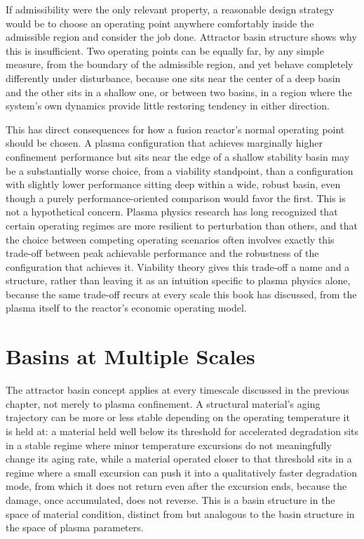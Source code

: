 If admissibility were the only relevant property, a reasonable design strategy would be to choose an operating point anywhere comfortably inside the admissible region and consider the job done. Attractor basin structure shows why this is insufficient. Two operating points can be equally far, by any simple measure, from the boundary of the admissible region, and yet behave completely differently under disturbance, because one sits near the center of a deep basin and the other sits in a shallow one, or between two basins, in a region where the system's own dynamics provide little restoring tendency in either direction.

This has direct consequences for how a fusion reactor's normal operating point should be chosen. A plasma configuration that achieves marginally higher confinement performance but sits near the edge of a shallow stability basin may be a substantially worse choice, from a viability standpoint, than a configuration with slightly lower performance sitting deep within a wide, robust basin, even though a purely performance-oriented comparison would favor the first. This is not a hypothetical concern. Plasma physics research has long recognized that certain operating regimes are more resilient to perturbation than others, and that the choice between competing operating scenarios often involves exactly this trade-off between peak achievable performance and the robustness of the configuration that achieves it. Viability theory gives this trade-off a name and a structure, rather than leaving it as an intuition specific to plasma physics alone, because the same trade-off recurs at every scale this book has discussed, from the plasma itself to the reactor's economic operating model.

\section{Basins at Multiple Scales}

The attractor basin concept applies at every timescale discussed in the previous chapter, not merely to plasma confinement. A structural material's aging trajectory can be more or less stable depending on the operating temperature it is held at: a material held well below its threshold for accelerated degradation sits in a stable regime where minor temperature excursions do not meaningfully change its aging rate, while a material operated closer to that threshold sits in a regime where a small excursion can push it into a qualitatively faster degradation mode, from which it does not return even after the excursion ends, because the damage, once accumulated, does not reverse. This is a basin structure in the space of material condition, distinct from but analogous to the basin structure in the space of plasma parameters.

